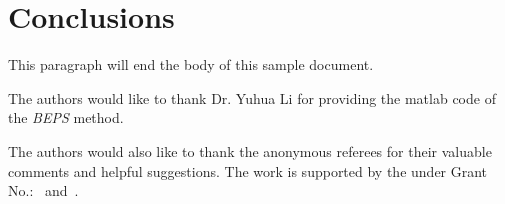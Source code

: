 \section{Conclusions}
This paragraph will end the body of this sample document.


\begin{acks}
  The authors would like to thank Dr. Yuhua Li for providing the
  matlab code of  the \textit{BEPS} method. 

  The authors would also like to thank the anonymous referees for
  their valuable comments and helpful suggestions. The work is
  supported by the  under Grant
  No.:~
  and~.

\end{acks}
